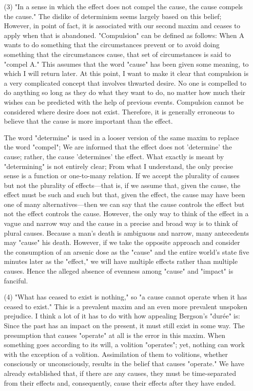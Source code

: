 \documentclass[a4paper,12pt]{book}[2004/02/16]
\theoremstyle{ilemma}
\theoremstyle{itheorem}
\theoremstyle{iother}
\theoremstyle{icorollary}
\theoremstyle{numcorollary}
\theoremstyle{idefinition}
\begin{document}
(3) "In a sense in which the effect does not compel the cause, the cause compels the cause." The dislike of determinism seems largely based on this belief; However, in point of fact, it is associated with our second maxim and ceases to apply when that is abandoned. "Compulsion" can be defined as follows: When A wants to do something that the circumstances prevent or to avoid doing something that the circumstances cause, that set of circumstances is said to "compel A."
This assumes that the word "cause" has been given some meaning, to which I will return later. At this point, I want to make it clear that compulsion is a very complicated concept that involves thwarted desire. No one is compelled to do anything so long as they do what they want to do, no matter how much their wishes can be predicted with the help of previous events. Compulsion cannot be considered where desire does not exist. Therefore, it is generally erroneous to believe that the cause is more important than the effect.

The word "determine" is used in a looser version of the same maxim to replace the word "compel"; We are informed that the effect does not 'determine' the cause; rather, the cause 'determines' the effect. What exactly is meant by "determining" is not entirely clear; From what I understand, the only precise sense is a function or one-to-many relation.
If we accept the plurality of causes but not the plurality of effects—that is, if we assume that, given the cause, the effect must be such and such but that, given the effect, the cause may have been one of many alternatives—then we can say that the cause controls the effect but not the effect controls the cause. However, the only way to think of the effect in a vague and narrow way and the cause in a precise and broad way is to think of plural causes. Because a man's death is ambiguous and narrow, many antecedents may "cause" his death. However, if we take the opposite approach and consider the consumption of an arsenic dose as the "cause" and the entire world's state five minutes later as the "effect," we will have multiple effects rather than multiple causes. Hence the alleged absence of
evenness among "cause" and "impact" is fanciful.

(4) "What has ceased to exist is nothing," so "a cause cannot operate when it has ceased to exist." This is a prevalent maxim and an even more prevalent unspoken prejudice. I think a lot of it has to do with how appealing Bergson's "durée" is: Since the past has an impact on the present, it must still exist in some way. The presumption that causes "operate" at all is the error in this maxim. When something goes according to its will, a volition "operates"; yet, nothing can
work with the exception of a volition. Assimilation of them to volitions, whether consciously or unconsciously, results in the belief that causes "operate." We have already established that, if there are any causes, they must be time-separated from their effects and, consequently, cause their effects after they have ended.
\end{document}
